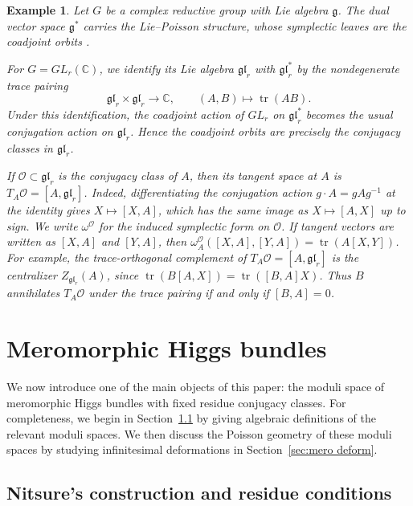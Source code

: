 \documentclass[11pt]{amsart}
\theoremstyle{plain}
\newtheorem{example}[theorem]{Example}
\theoremstyle{definition}
\theoremstyle{remark}
\newcommand{\C}{\mathbb C}
\newcommand{\cO}{\mathcal O}
\def\C{\mathbb{C}}
\begin{document}
\begin{example}\label{ex:GLn-linear algebra}
Let $G$ be a complex reductive group with Lie algebra $\mathfrak g$. The dual vector space $\mathfrak g^*$ carries the Lie--Poisson structure, whose symplectic leaves are the coadjoint orbits \cite[Section 1.3]{ChrissGinzburg1997}.

For $G=GL_r(\C)$, we identify its Lie algebra $\mathfrak{gl}_r$ with $\mathfrak{gl}_r^*$ by the nondegenerate trace pairing
\[
\mathfrak{gl}_r\times \mathfrak{gl}_r\longrightarrow \mathbb C,
\qquad
(A,B)\longmapsto \operatorname{tr}(AB).
\]
 Under this identification, the coadjoint action of $GL_r$ on $\mathfrak{gl}_r^*$ becomes the usual conjugation action on $\mathfrak{gl}_r$. Hence the coadjoint orbits are precisely the conjugacy classes in $\mathfrak{gl}_r$.

If $\mathcal O\subset\mathfrak{gl}_r$ is the conjugacy class of $A$, then its tangent space at $A$ is $T_A\mathcal O=[A,\mathfrak{gl}_r]$. Indeed, differentiating the conjugation action $g\cdot A=gAg^{-1}$ at the identity gives $X\mapsto [X,A]$, which has the same image as $X\mapsto [A,X]$ up to sign. We write $\omega^{\cO}$ for the induced symplectic form on $\cO$.  If tangent vectors are written as $[X,A]$ and $[Y,A]$, then $\omega_A^{\cO}([X,A],[Y,A])
=
\operatorname{tr}(A[X,Y])$. 
For example, the trace-orthogonal complement of $T_A\mathcal O=[A,\mathfrak{gl}_r]$ is the centralizer $Z_{\mathfrak{gl}_r}(A)$, since $\operatorname{tr}(B[A,X])=
\operatorname{tr}([B,A]X)$. 
Thus $B$ annihilates $T_A\mathcal O$ under the trace pairing if and only if $[B,A]=0$.
\end{example}




\section{Meromorphic Higgs bundles}\label{sec:stacky-defs}

We now introduce one of the main objects of this paper: the moduli space of meromorphic Higgs bundles with fixed residue conjugacy classes. For completeness, we begin in Section~\ref{sec: construction mero moduli} by giving algebraic definitions of the relevant moduli spaces. We then discuss the Poisson geometry of these moduli spaces by studying infinitesimal deformations in Section~\ref{sec:mero deform}. 

\subsection{Nitsure's construction and residue conditions}\label{sec: construction mero moduli}
\end{document}
